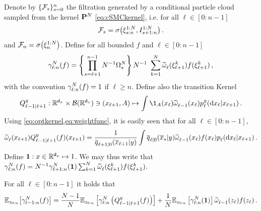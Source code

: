 Denote by $\{ \mathcal{F}_{s} \}_{s = 0} ^n$ the filtration generated by a conditional particle cloud sampled from the kernel $\mathbf{P}^N _{}$ \eqref{eq:cSMCkernel}, i.e. for all $\ell \in [0:n-1]$
\[ 
    \mathcal{F}_{s} = \sigma\big( \xi^{1:N} _{s:n}, \smash{I^{1:N} _{s+1:n}} \big) \,.
\]
and $\mathcal{F}_{n} = \sigma\big( \xi^{1:N} _{n} \big)$. Define for all bounded $f$ and $\ell \in [0:n-1]$
\begin{equation} 
    \normconstest{\ell:n}(f) = \left\{ \prod_{s = \ell + 1}^{n-1} N^{-1} \sumweight{s} \right\} N^{-1} \sum_{k = 1}^N \uweight{}{\ell}(\particle^{k} _{\ell+1}) f(\particle^{k} _{\ell+1}) \eqsp,
\end{equation}
with the convention $\gamma^N _{\ell:n}(f) = 1$ if $\ell \geq n$.
Define also the transition Kernel 
\begin{equation} 
    \Qker{\ell-1|\ell+1}{y}: \R^{\dimx} \times \sigalgebra(\R^{\dimx}) \ni (x_{\ell+1}, A) \mapsto \int \1_A(x_\ell) \uweight{}{\ell-1}(\lstate_\ell) \bwopt{\ell}{y}{\lstate_{\ell+1}}{\rmd \lstate_{\ell}}  \eqsp.
\end{equation}
Using \cref{eq:optkernel,eq:weightfunc}, it is easily seen that for all $\ell \in [0:n-1]$, 
\begin{equation}
    \label{eq:Qidentity} 
    \uweight{}{\ell}(\lstate_{\ell+1}) \Qker{\ell-1|\ell+1}{y}(f)(\lstate_{\ell+1}) = \frac{1}{\tfwtrans{\ell+1|0}{\lmeas}{\ltopstate_{\ell+1}}} \int \tfwtrans{\ell|0}{\lmeas}{\ltopstate_s} \uweight{}{\ell-1}(x_\ell) f(\lstate_\ell) \bwtrans{}{\ell}{x_{\ell+1}}{\rmd x_\ell} \eqsp.
\end{equation}
Define $\mathbf{1}: x \in \mathbb{R}^{{\mathsf{d}_x}} \mapsto 1$. We may thus write that $\gamma^N _{\ell:n}(f) = N^{-1} \gamma^N _{\ell+1:n}(\mathbf{1}) \sum_{k = 1}^N \widetilde{\omega}^{} _{\ell}(\xi^{k} _{\ell+1}) f(\xi^{k} _{\ell+1}).$
\begin{lemma} 
    \label{lem:normconst_identity}
For all $\ell \in [0:n-1]$ it holds that
\begin{equation*} 
    \mathbb{E}_{z_{0:n}} \big[ \gamma^N _{\ell-1:n}(f) \big] = \frac{N-1}{N} \mathbb{E}_{z_{0:n}} \left[ \gamma^N _{\ell:n}\left( Q_{\ell-1|\ell+1} ^{y}(f)\right)\right] + \frac{1}{N} \mathbb{E}_{z_{0:n}} \left[ \gamma^N _{\ell:n}(\mathbf{1}) \right] \widetilde{\omega}^{} _{\ell-1}( z_{\ell}) f(z_{\ell}) \,.
\end{equation*}
\end{lemma}

